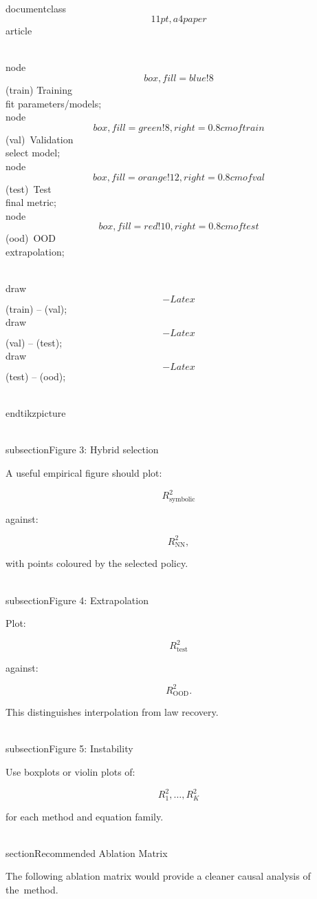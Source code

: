 \\documentclass\[11pt,a4paper\]{article}
\begin{document}
 \\node\[box,fill=blue!8\] (train) {Training\\fit parameters/models};\
 \\node\[box,fill=green!8,right=0.8cm of train\] (val)\
 {Validation\\select model};\
 \\node\[box,fill=orange!12,right=0.8cm of val\] (test)\
 {Test\\final metric};\
 \\node\[box,fill=red!10,right=0.8cm of test\] (ood)\
 {OOD\\extrapolation};

 \\draw\[-{Latex}\] (train) -- (val);\
 \\draw\[-{Latex}\] (val) -- (test);\
 \\draw\[-{Latex}\] (test) -- (ood);

 \\end{tikzpicture}

 \\subsection{Figure 3: Hybrid selection}

 A useful empirical figure should plot:

 $$
R^2_{\mathrm{symbolic}}
$$

 against:

 $$
R^2_{\mathrm{NN}},
$$

 with points coloured by the selected policy.

 \\subsection{Figure 4: Extrapolation}

 Plot:

 $$
R^2_{\mathrm{test}}
$$

 against:

 $$
R^2_{\mathrm{OOD}}.
$$

 This distinguishes interpolation from law recovery.

 \\subsection{Figure 5: Instability}

 Use boxplots or violin plots of:

 $$
R^2_1,\ldots,R^2_K
$$

 for each method and equation family.

 \\section{Recommended Ablation Matrix}\

 The following ablation matrix would provide a cleaner causal analysis of the\
 method.
\end{document}
